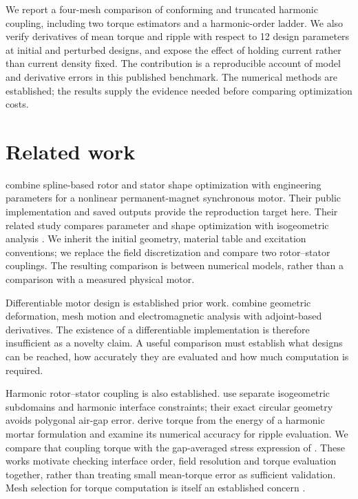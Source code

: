 \documentclass{anvil-paper}
\begin{document}
We report a four-mesh comparison of conforming and truncated harmonic
coupling, including two torque estimators and a harmonic-order ladder.
We also verify derivatives of mean torque and ripple with respect to
12 design parameters at initial and perturbed designs, and expose the
effect of holding current rather than current density fixed. The
contribution is a reproducible account of model and derivative errors in
this published benchmark. The numerical methods are established; the
results supply the evidence needed before comparing optimization costs.

\section{Related work}
\citet{wiesheu2024spline} combine spline-based rotor and stator shape
optimization with engineering parameters for a nonlinear permanent-magnet
synchronous motor. Their public implementation and saved outputs provide
the reproduction target here. Their related study compares parameter and
shape optimization with isogeometric analysis
\citep{wiesheu2025combined}. We inherit the initial geometry, material
table and excitation conventions; we replace the field discretization and compare two
rotor--stator couplings. The resulting comparison is between numerical
models, rather than a comparison with a measured physical motor.

Differentiable motor design is established prior work.
\citet{scotzniovsky2024} combine geometric deformation, mesh motion and
electromagnetic analysis with adjoint-based derivatives. The existence of
a differentiable implementation is therefore insufficient as a novelty
claim. A useful comparison must establish what designs can be reached,
how accurately they are evaluated and how much computation is required.

Harmonic rotor--stator coupling is also established.
\citet{bontinck2018isogeometric} use separate isogeometric subdomains and
harmonic interface constraints; their exact circular geometry avoids
polygonal air-gap error. \citet{egger2022torque} derive torque from the
energy of a harmonic mortar formulation and examine its numerical
accuracy for ripple evaluation. We compare that coupling torque with the
gap-averaged stress expression of \citet{arkkio1987}. These works motivate
checking interface order, field resolution and torque evaluation together,
rather than treating small mean-torque error as sufficient validation.
Mesh selection for torque computation is itself an established concern
\citep{arkkio2012proper}.
\end{document}
